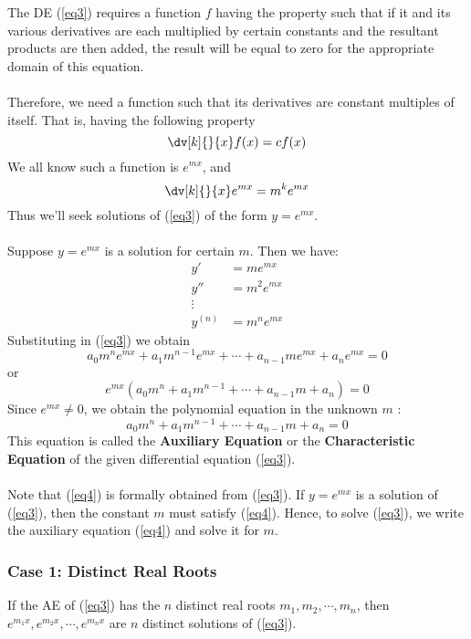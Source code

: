The DE (\ref{eq3}) requires a function $f$ having the property such that if it and its various derivatives are each multiplied by certain constants and the resultant products are then added, the result will be equal to zero for the appropriate domain of this equation.\\~\\
Therefore, we need a function such that its derivatives are constant multiples of itself. That is, having the following property \[
    \dv[k]{}{x} f(x) = cf(x)
\]
We all know such a function is $e^{mx}$, and \[
    \dv[k]{}{x} e^{mx} = m^ke^{mx}
\]
Thus we'll seek solutions of (\ref{eq3}) of the form $y=e^{mx}$.\\~\\
Suppose $y=e^{mx}$ is a solution for certain $m$. Then we have:
\begin{align*}
    y' &= me^{mx} \\
    y'' &= m^2e^{mx} \\
    \vdots & \\
    y^{(n)} &= m^ne^{mx}
\end{align*}
Substituting in (\ref{eq3}) we obtain \[
    a_0m^ne^{mx} + a_1m^{n-1}e^{mx} + \cdots + a_{n-1}me^{mx} + a_ne^{mx} = 0
\] or \[
    e^{mx}( a_0m^n + a_1m^{n-1} + \cdots + a_{n-1}m + a_n ) = 0
\]
Since $e^{mx} \neq 0$, we obtain the polynomial equation in the unknown $m$ :
\begin{equation} \label{eq4}
    a_0m^n + a_1m^{n-1} + \cdots + a_{n-1}m + a_n = 0
\end{equation}
This equation is called the \textbf{Auxiliary Equation} or the \textbf{Characteristic Equation} of the given differential equation (\ref{eq3}).\\~\\
Note that (\ref{eq4}) is formally obtained from (\ref{eq3}). If $y=e^{mx}$ is a solution of (\ref{eq3}), then the constant $m$ must satisfy (\ref{eq4}). Hence, to solve (\ref{eq3}), we write the auxiliary equation (\ref{eq4}) and solve it for $m$.


\vspace{20pt}
\subsubsection{Case 1: Distinct Real Roots}

If the AE of (\ref{eq3}) has the $n$ distinct real roots $m_1, m_2, \cdots, m_n$, then $e^{m_1x}, e^{m_2x}, \cdots, e^{m_nx}$ are $n$ distinct solutions of (\ref{eq3}).

